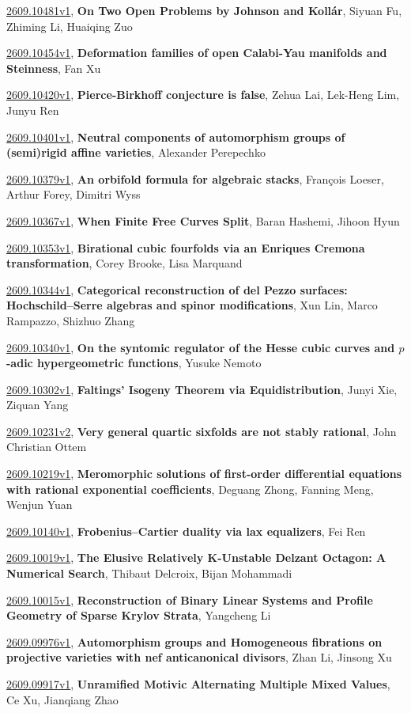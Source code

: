 \documentclass[9pt, a4paper]{article}
\theoremstyle{plain}
\theoremstyle{definition}
\theoremstyle{remark}
\newcommand{\arxiv}[3]{\href{https://arxiv.org/abs/#1}{#1}, \textbf{\textcolor{arxivblue}{#2}}, #3}
\begin{document}
\arxiv{2609.10481v1}{On Two Open Problems by Johnson and Kollár}{Siyuan Fu, Zhiming Li, Huaiqing Zuo}

\arxiv{2609.10454v1}{Deformation families of open Calabi-Yau manifolds and Steinness}{Fan Xu}

\arxiv{2609.10420v1}{Pierce-Birkhoff conjecture is false}{Zehua Lai, Lek-Heng Lim, Junyu Ren}

\arxiv{2609.10401v1}{Neutral components of automorphism groups of (semi)rigid affine varieties}{Alexander Perepechko}

\arxiv{2609.10379v1}{An orbifold formula for algebraic stacks}{François Loeser, Arthur Forey, Dimitri Wyss}

\arxiv{2609.10367v1}{When Finite Free Curves Split}{Baran Hashemi, Jihoon Hyun}

\arxiv{2609.10353v1}{Birational cubic fourfolds via an Enriques Cremona transformation}{Corey Brooke, Lisa Marquand}

\arxiv{2609.10344v1}{Categorical reconstruction of del Pezzo surfaces: Hochschild--Serre algebras and spinor modifications}{Xun Lin, Marco Rampazzo, Shizhuo Zhang}

\arxiv{2609.10340v1}{On the syntomic regulator of the Hesse cubic curves and $p$-adic hypergeometric functions}{Yusuke Nemoto}

\arxiv{2609.10302v1}{Faltings' Isogeny Theorem via Equidistribution}{Junyi Xie, Ziquan Yang}

\arxiv{2609.10231v2}{Very general quartic sixfolds are not stably rational}{John Christian Ottem}

\arxiv{2609.10219v1}{Meromorphic solutions of first-order differential equations with rational exponential coefficients}{Deguang Zhong, Fanning Meng, Wenjun Yuan}

\arxiv{2609.10140v1}{Frobenius--Cartier duality via lax equalizers}{Fei Ren}

\arxiv{2609.10019v1}{The Elusive Relatively K-Unstable Delzant Octagon: A Numerical Search}{Thibaut Delcroix, Bijan Mohammadi}

\arxiv{2609.10015v1}{Reconstruction of Binary Linear Systems and Profile Geometry of Sparse Krylov Strata}{Yangcheng Li}

\arxiv{2609.09976v1}{Automorphism groups and Homogeneous fibrations on projective varieties with nef anticanonical divisors}{Zhan Li, Jinsong Xu}

\arxiv{2609.09917v1}{Unramified Motivic Alternating Multiple Mixed Values}{Ce Xu, Jianqiang Zhao}
\end{document}
